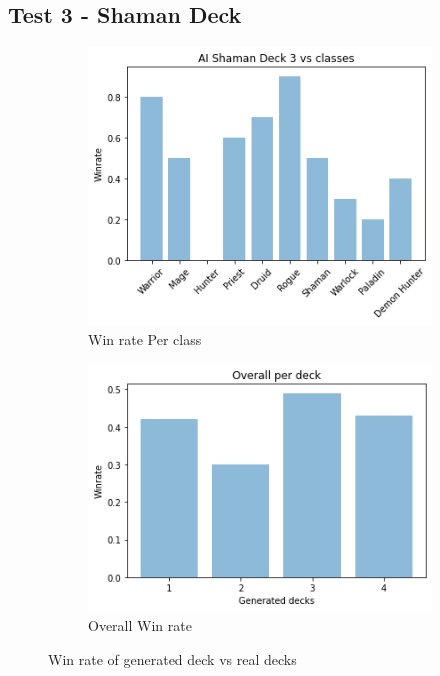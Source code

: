 \documentclass{report} %
\begin{document}
\subsection{Test 3 - Shaman Deck}
\begin{figure}[H]
\centering
\begin{subfigure}{.5\textwidth}
 \centering
 \includegraphics[width=1\linewidth]{TestImages/ShamanDeckWinrateClasses}
 \caption{Win rate Per class}
\end{subfigure}%
\begin{subfigure}{.5\textwidth}
 \centering
 \includegraphics[width=1\linewidth]{TestImages/ShamanAllGeneratedDeckOverallWinrate}
 \caption{Overall Win rate}
\end{subfigure}
\caption{Win rate of generated deck vs real decks}
\end{figure}
\end{document}
